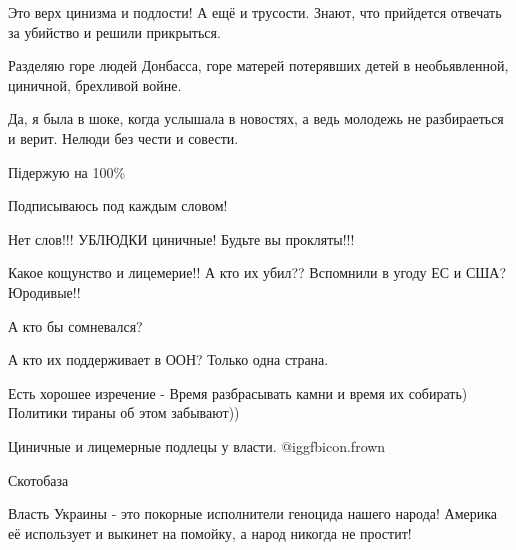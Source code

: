 Это верх цинизма и подлости!  А ещё и трусости.  Знают, что прийдется отвечать
за убийство и решили прикрыться.


Разделяю горе людей Донбасса, горе матерей потерявших детей в необьявленной,
циничной, брехливой войне.


Да, я была в шоке, когда услышала в новостях, а ведь молодежь не разбираеться и верит. Нелюди без чести и совести.


Підержую на 100\%

Подписываюсь под каждым словом!


Нет слов!!! УБЛЮДКИ циничные! Будьте вы прокляты!!!


Какое кощунство и лицемерие!! А кто их убил?? Вспомнили в угоду ЕС и США? Юродивые!!


А кто бы сомневался?


А кто их поддерживает в ООН? Только одна страна.


Есть хорошее изречение - Время разбрасывать камни и время их собирать) Политики тираны об этом забывают))


Циничные и лицемерные подлецы у власти.  @igg{fbicon.frown} 


Скотобаза


Власть Украины - это покорные исполнители геноцида нашего народа! Америка её
использует и выкинет на помойку, а народ никогда не простит!
